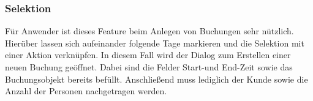 \subsubsection{Selektion}
Für Anwender ist dieses Feature beim Anlegen von Buchungen sehr nützlich. Hierüber lassen sich aufeinander folgende Tage markieren und die Selektion mit einer Aktion verknüpfen.
In diesem Fall wird der Dialog zum Erstellen einer neuen Buchung geöffnet.
Dabei sind die Felder Start-und End-Zeit sowie das Buchungsobjekt bereits befüllt. Anschließend muss lediglich der Kunde sowie die Anzahl der Personen nachgetragen werden.